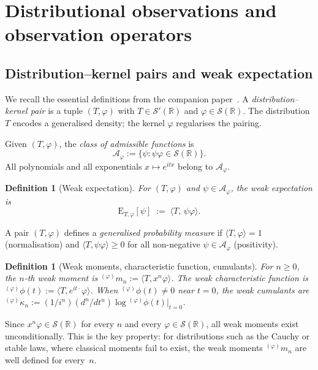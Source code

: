 \documentclass[11pt,a4paper]{article}
\newtheorem{definition}[theorem]{Definition}
\newcommand{\E}{\mathrm{E}}
\newcommand{\R}{\mathbb{R}}
\begin{document}
\section{Distributional observations and observation operators}\label{sec:observations}

\subsection{Distribution--kernel pairs and weak expectation}\label{subsec:dk-pairs}

We recall the essential definitions from the companion
paper~\cite{LabouriauA1}.  A \emph{distribution--kernel pair} is a tuple
$(T, \varphi)$ with $T \in \mathcal S'(\R)$ and
$\varphi \in \mathcal S(\R)$.  The distribution $T$ encodes a generalised
density; the kernel $\varphi$ regularises the pairing.

Given $(T, \varphi)$, the \emph{class of admissible functions} is
\[
\mathcal A_\varphi
:= \{\psi : \psi\varphi \in \mathcal S(\R)\}.
\]
All polynomials and all exponentials $x \mapsto e^{itx}$ belong to
$\mathcal A_\varphi$.

\begin{definition}[Weak expectation]\label{def:weak-exp}
For $(T, \varphi)$ and $\psi \in \mathcal A_\varphi$, the \emph{weak
expectation} is
\[
\E_{T,\varphi}[\psi]
\;:=\;
\langle T,\, \psi\varphi \rangle.
\]
\end{definition}

A pair $(T, \varphi)$ defines a \emph{generalised probability measure} if
$\langle T, \varphi \rangle = 1$ (normalisation) and
$\langle T, \psi\varphi \rangle \geq 0$ for all non-negative
$\psi \in \mathcal A_\varphi$ (positivity).

\begin{definition}[Weak moments, characteristic function, cumulants]\label{def:weak-objects}
For $n \geq 0$, the $n$-th \emph{weak moment} is
${}^{(\varphi)}m_n := \langle T, x^n\varphi \rangle$.
The \emph{weak characteristic function} is
${}^{(\varphi)}\phi(t) := \langle T, e^{it\cdot}\varphi \rangle$.
When ${}^{(\varphi)}\phi(t) \neq 0$ near $t=0$, the \emph{weak cumulants}
are
${}^{(\varphi)}\kappa_n := (1/i^n)(d^n/dt^n)\log {}^{(\varphi)}\phi(t)|_{t=0}$.
\end{definition}

Since $x^n\varphi \in \mathcal S(\R)$ for every $n$ and every
$\varphi \in \mathcal S(\R)$, all weak moments exist unconditionally.  This
is the key property: for distributions such as the Cauchy or stable laws,
where classical moments fail to exist, the weak moments
${}^{(\varphi)}m_n$ are well defined for every~$n$.
\end{document}
